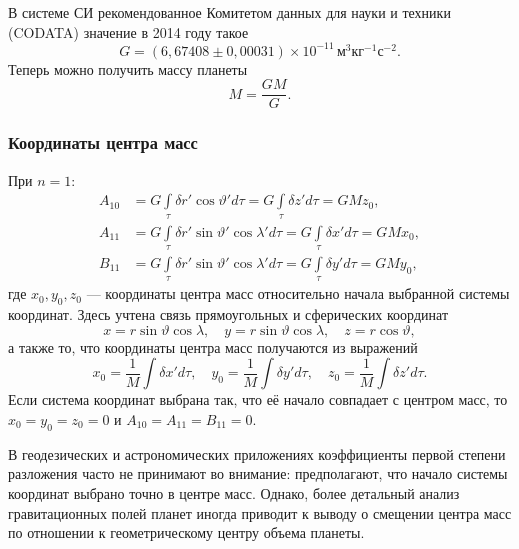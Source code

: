 \documentclass[11pt, a4paper,addpoints]{exam}
\theoremstyle{remark}
\renewcommand{\theta}{\vartheta}
\begin{document}
    В системе СИ рекомендованное Комитетом данных для науки и техники (CODATA) значение в 2014 году\cite{CODATA2014} такое
    \begin{equation*}
        G = (6,67408 \pm 0,00031)\times10^{-11}\,\text{м}^3\text{кг}^{-1}\text{с}^{-2}.
    \end{equation*}
    Теперь можно получить массу планеты
    \begin{equation}
        \label{eq:mass}
        M = \dfrac{GM}{G}.
    \end{equation}

    \subsubsection*{Координаты центра масс}
    При $n = 1$:
    \begin{align*}
        A_{10} &= G \int\limits_\tau \delta r' \cos{\theta'}d\tau =
        G \int\limits_\tau \delta z'd\tau = GMz_0, \\
        A_{11} &= G \int\limits_\tau \delta r' \sin{\theta'}\cos{\lambda'}d\tau = 
        G \int\limits_\tau \delta x'd\tau = GMx_0, \\
        B_{11} &= G \int\limits_\tau \delta r' \sin{\theta'}\cos{\lambda'}d\tau = 
        G \int\limits_\tau \delta y'd\tau = GMy_0,
    \end{align*}
    где $x_0, y_0, z_0$ --- координаты центра масс относительно начала выбранной системы координат. 
    Здесь учтена связь  прямоугольных и сферических координат
    \begin{equation*}
        x = r\sin\theta\cos\lambda, \quad y = r\sin\theta\cos\lambda, \quad z = r\cos\theta,
    \end{equation*}
    а также то, что координаты центра масс получаются из выражений
    \begin{equation*}
        x_0 = \dfrac{1}{M} \int \delta x' d\tau, \quad
        y_0 = \dfrac{1}{M} \int \delta y' d\tau, \quad
        z_0 = \dfrac{1}{M} \int \delta z' d\tau.
    \end{equation*}
    Если система координат выбрана так, что её начало совпадает с центром масс, то $x_0 = y_0 = z_0
    = 0$ и $A_{10} = A_{11} = B_{11} = 0$.

    В геодезических и астрономических приложениях коэффициенты первой степени 
    разложения часто не принимают во внимание: предполагают,
    что начало системы координат выбрано точно в центре масс. Однако, более детальный анализ
    гравитационных полей планет иногда приводит к выводу о смещении центра масс по отношении к
    геометрическому центру объема планеты.
\end{document}
